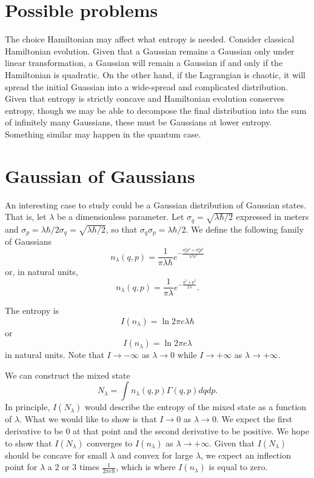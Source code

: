 \documentclass[11pt]{article}
\begin{document}
\section{Possible problems}

The choice Hamiltonian may affect what entropy is needed. Consider classical Hamiltonian evolution. Given that a Gaussian remains a Gaussian only under linear transformation, a Gaussian will remain a Gaussian if and only if the Hamiltonian is quadratic. On the other hand, if the Lagrangian is chaotic, it will spread the initial Guassian into a wide-spread and complicated distribution. Given that entropy is strictly concave and Hamiltonian evolution conserves entropy, though we may be able to decompose the final distribution into the sum of infinitely many Gaussians, these must be Gaussians at lower entropy. Something similar may happen in the quantum case.

\section{Gaussian of Gaussians}

An interesting case to study could be a Gaussian distribution of Gaussian states. That is, let $\lambda$ be a dimensionless parameter. Let $\sigma_q = \sqrt{\lambda\hbar /2}$ expressed in meters and $\sigma_p = \lambda \hbar / 2 \sigma_q = \sqrt{\lambda\hbar /2}$, so that $\sigma_q\sigma_p = \lambda \hbar / 2$. We define the following family of Gaussians
\begin{equation}
	n_\lambda(q,p) = \frac{1}{\pi \lambda \hbar} e^{-\frac{\sigma_p^2 q^2 + \sigma_q^2 p^2}{\lambda^2 \hbar^2}}
\end{equation}
or, in natural units,
\begin{equation}
	n_\lambda(q,p) = \frac{1}{\pi \lambda} e^{-\frac{q^2 + p^2}{2 \lambda}}.
\end{equation}

The entropy is
\begin{equation}
	I(n_\lambda) = \ln 2 \pi e \lambda \hbar
\end{equation}
or
\begin{equation}
	I(n_\lambda) = \ln 2 \pi e \lambda
\end{equation}
in natural units.
Note that $I \to - \infty$ as $\lambda \to 0$ while $I \to + \infty$ as $\lambda \to + \infty$.

We can construct the mixed state
\begin{equation}
	N_\lambda = \int n_\lambda(q,p) \Gamma(q,p) dq dp.
\end{equation}
In principle, $I(N_\lambda)$ would describe the entropy of the mixed state as a function of $\lambda$. What we would like to show is that $I \to 0$ as $\lambda \to 0$. We expect the first derivative to be $0$ at that point and the second derivative to be positive. We hope to show that $I(N_\lambda)$ converges to $I(n_\lambda)$ as $\lambda \to +\infty$. Given that $I(N_\lambda)$ should be concave for small $\lambda$ and convex for large $\lambda$, we expect an inflection point for $\lambda$ a 2 or 3 times $\frac{1}{2 \pi e \hbar}$, which is where $I(n_\lambda)$ is equal to zero.
\end{document}

